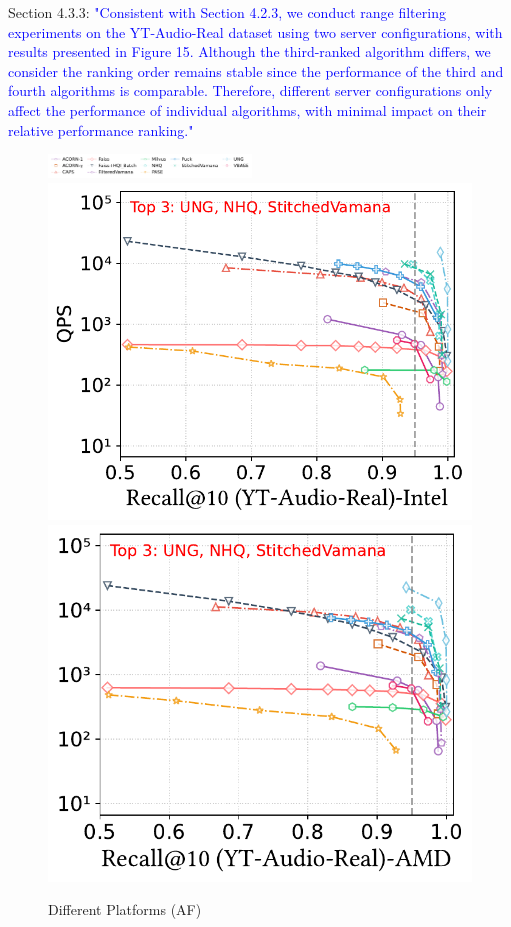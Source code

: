 \documentclass[sigconf, nonacm]{acmart}
\begin{document}
Section 4.3.3:
\textcolor{blue}{"Consistent with Section 4.2.3, we conduct range filtering experiments on the YT-Audio-Real dataset using two server configurations, with results presented in Figure 15. Although the third-ranked algorithm differs, we consider the ranking order remains stable since the performance of the third and fourth algorithms is comparable. Therefore, different server configurations only affect the performance of individual algorithms, with minimal impact on their relative performance ranking."}

\begin{figure}[htbp]
	\centering
	\includegraphics[width=0.48\textwidth]{fig/attribute_legend.pdf}
	\includegraphics[width=0.495\linewidth]{fig/attribute_85.pdf}
	\includegraphics[width=0.47\linewidth]{fig/attribute_71.pdf}
	\caption{Different Platforms (AF)}
	\label{fig:attribute-cross-platform}
\end{figure}
\end{document}

